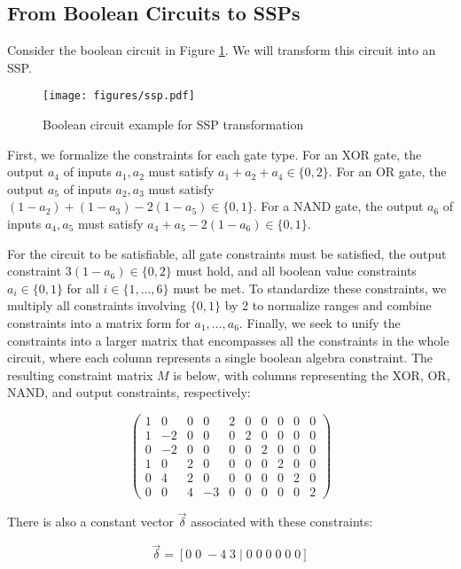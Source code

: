 \subsection{From Boolean Circuits to SSPs}

Consider the boolean circuit in Figure \ref{fig:ssp}. We will transform this circuit into an SSP.

\begin{figure}[h]
  \centering
  \texttt{[image: figures/ssp.pdf]}
  \caption{Boolean circuit example for SSP transformation \label{fig:ssp}} 
\end{figure}

First, we formalize the constraints for each gate type. For an XOR gate, the output $a_4$ of inputs $a_1, a_2$ must satisfy $a_1 + a_2 + a_4 \in \{0, 2\}$. For an OR gate, the output $a_5$ of inputs $a_2, a_3$ must satisfy $(1-a_2) + (1-a_3) - 2(1-a_5) \in \{0, 1\}$. For a NAND gate, the output $a_6$ of inputs $a_4, a_5$ must satisfy $a_4 + a_5 - 2(1-a_6) \in \{0, 1\}$.

For the circuit to be satisfiable, all gate constraints must be satisfied, the output constraint $3(1 - a_6) \in \{0, 2\}$ must hold, and all boolean value constraints $a_i \in \{0, 1\}$ for all $i \in \{1,\ldots,6\}$ must be met. To standardize these constraints, we multiply all constraints involving $\{0, 1\}$ by 2 to normalize ranges and combine constraints into a matrix form for $a_1,\ldots,a_6$. Finally, we seek to unify the constraints into a larger matrix that encompasses all the constraints in the whole circuit, where each column represents a single boolean algebra constraint. The resulting constraint matrix $M$ is below, with columns representing the XOR, OR, NAND, and output constraints, respectively:

\[ \begin{pmatrix}
1 & 0 & 0 & 0 & 2 & 0 & 0 & 0 & 0 & 0 \\
1 & -2 & 0 & 0 & 0 & 2 & 0 & 0 & 0 & 0 \\
0 & -2 & 0 & 0 & 0 & 0 & 2 & 0 & 0 & 0 \\
1 & 0 & 2 & 0 & 0 & 0 & 0 & 2 & 0 & 0 \\
0 & 4 & 2 & 0 & 0 & 0 & 0 & 0 & 2 & 0 \\
0 & 0 & 4 & -3 & 0 & 0 & 0 & 0 & 0 & 2
\end{pmatrix} \]

There is also a constant vector $\vec{\delta}$ associated with these constraints:

\[ \vec{\delta} = [0 \; 0 \; -4 \; 3 \; | \; 0 \; 0 \; 0 \; 0 \; 0 \; 0] \]

